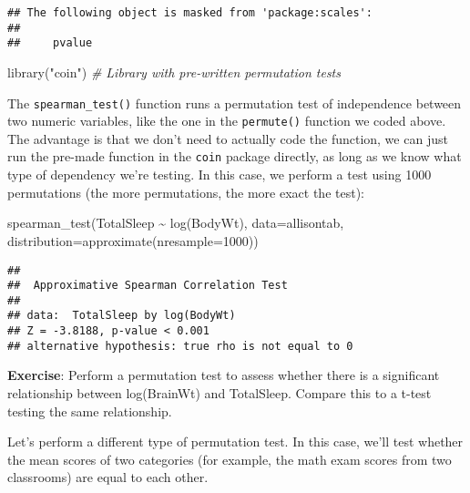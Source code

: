 \documentclass[
]{book}
\newenvironment{Shaded}{\begin{snugshade}}{\end{snugshade}}
\newcommand{\AttributeTok}[1]{\textcolor[rgb]{0.77,0.63,0.00}{#1}}
\newcommand{\CommentTok}[1]{\textcolor[rgb]{0.56,0.35,0.01}{\textit{#1}}}
\newcommand{\DecValTok}[1]{\textcolor[rgb]{0.00,0.00,0.81}{#1}}
\newcommand{\FunctionTok}[1]{\textcolor[rgb]{0.00,0.00,0.00}{#1}}
\newcommand{\NormalTok}[1]{#1}
\newcommand{\SpecialCharTok}[1]{\textcolor[rgb]{0.00,0.00,0.00}{#1}}
\newcommand{\StringTok}[1]{\textcolor[rgb]{0.31,0.60,0.02}{#1}}
\begin{document}
\begin{verbatim}
## The following object is masked from 'package:scales':
## 
##     pvalue
\end{verbatim}

\begin{Shaded}
\begin{Highlighting}[]
\FunctionTok{library}\NormalTok{(}\StringTok{"coin"}\NormalTok{) }\CommentTok{\# Library with pre{-}written permutation tests}
\end{Highlighting}
\end{Shaded}

The \texttt{spearman\_test()} function runs a permutation test of independence between two numeric variables, like the one in the \texttt{permute()} function we coded above. The advantage is that we don't need to actually code the function, we can just run the pre-made function in the \texttt{coin} package directly, as long as we know what type of dependency we're testing. In this case, we perform a test using 1000 permutations (the more permutations, the more exact the test):

\begin{Shaded}
\begin{Highlighting}[]
\FunctionTok{spearman\_test}\NormalTok{(TotalSleep }\SpecialCharTok{\textasciitilde{}} \FunctionTok{log}\NormalTok{(BodyWt), }\AttributeTok{data=}\NormalTok{allisontab, }\AttributeTok{distribution=}\FunctionTok{approximate}\NormalTok{(}\AttributeTok{nresample=}\DecValTok{1000}\NormalTok{)) }
\end{Highlighting}
\end{Shaded}

\begin{verbatim}
## 
##  Approximative Spearman Correlation Test
## 
## data:  TotalSleep by log(BodyWt)
## Z = -3.8188, p-value < 0.001
## alternative hypothesis: true rho is not equal to 0
\end{verbatim}

\textbf{Exercise}: Perform a permutation test to assess whether there is a significant relationship between log(BrainWt) and TotalSleep. Compare this to a t-test testing the same relationship.

Let's perform a different type of permutation test. In this case, we'll test whether the mean scores of two categories (for example, the math exam scores from two classrooms) are equal to each other.
\end{document}
